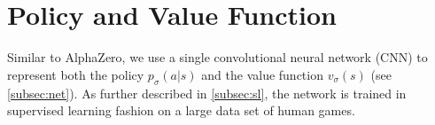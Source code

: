 \section{Policy and Value Function}
\label{sec:pv}
Similar to AlphaZero\cite{alphazero}, we use a single convolutional neural network (CNN) to represent both the policy $p_{\sigma} (a|s)$ and the value function $v_\sigma (s)$ (see \autoref{subsec:net}).
As further described in \autoref{subsec:sl}, the network is trained in supervised learning fashion on a large data set of human games.






